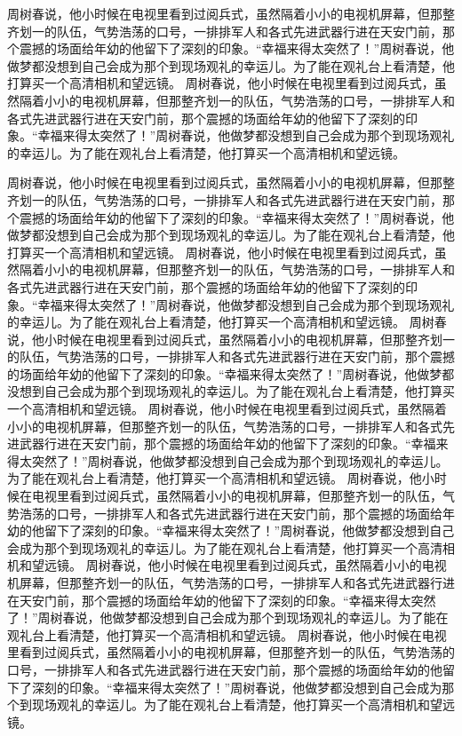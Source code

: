 周树春说，他小时候在电视里看到过阅兵式，虽然隔着小小的电视机屏幕，但那整齐划一的队伍，气势浩荡的口号，一排排军人和各式先进武器行进在天安门前，那个震撼的场面给年幼的他留下了深刻的印象。“幸福来得太突然了！”周树春说，他做梦都没想到自己会成为那个到现场观礼的幸运儿。为了能在观礼台上看清楚，他打算买一个高清相机和望远镜。
周树春说，他小时候在电视里看到过阅兵式，虽然隔着小小的电视机屏幕，但那整齐划一的队伍，气势浩荡的口号，一排排军人和各式先进武器行进在天安门前，那个震撼的场面给年幼的他留下了深刻的印象。“幸福来得太突然了！”周树春说，他做梦都没想到自己会成为那个到现场观礼的幸运儿。为了能在观礼台上看清楚，他打算买一个高清相机和望远镜。

周树春说，他小时候在电视里看到过阅兵式，虽然隔着小小的电视机屏幕，但那整齐划一的队伍，气势浩荡的口号，一排排军人和各式先进武器行进在天安门前，那个震撼的场面给年幼的他留下了深刻的印象。“幸福来得太突然了！”周树春说，他做梦都没想到自己会成为那个到现场观礼的幸运儿。为了能在观礼台上看清楚，他打算买一个高清相机和望远镜。
周树春说，他小时候在电视里看到过阅兵式，虽然隔着小小的电视机屏幕，但那整齐划一的队伍，气势浩荡的口号，一排排军人和各式先进武器行进在天安门前，那个震撼的场面给年幼的他留下了深刻的印象。“幸福来得太突然了！”周树春说，他做梦都没想到自己会成为那个到现场观礼的幸运儿。为了能在观礼台上看清楚，他打算买一个高清相机和望远镜。
周树春说，他小时候在电视里看到过阅兵式，虽然隔着小小的电视机屏幕，但那整齐划一的队伍，气势浩荡的口号，一排排军人和各式先进武器行进在天安门前，那个震撼的场面给年幼的他留下了深刻的印象。“幸福来得太突然了！”周树春说，他做梦都没想到自己会成为那个到现场观礼的幸运儿。为了能在观礼台上看清楚，他打算买一个高清相机和望远镜。
周树春说，他小时候在电视里看到过阅兵式，虽然隔着小小的电视机屏幕，但那整齐划一的队伍，气势浩荡的口号，一排排军人和各式先进武器行进在天安门前，那个震撼的场面给年幼的他留下了深刻的印象。“幸福来得太突然了！”周树春说，他做梦都没想到自己会成为那个到现场观礼的幸运儿。为了能在观礼台上看清楚，他打算买一个高清相机和望远镜。
周树春说，他小时候在电视里看到过阅兵式，虽然隔着小小的电视机屏幕，但那整齐划一的队伍，气势浩荡的口号，一排排军人和各式先进武器行进在天安门前，那个震撼的场面给年幼的他留下了深刻的印象。“幸福来得太突然了！”周树春说，他做梦都没想到自己会成为那个到现场观礼的幸运儿。为了能在观礼台上看清楚，他打算买一个高清相机和望远镜。
周树春说，他小时候在电视里看到过阅兵式，虽然隔着小小的电视机屏幕，但那整齐划一的队伍，气势浩荡的口号，一排排军人和各式先进武器行进在天安门前，那个震撼的场面给年幼的他留下了深刻的印象。“幸福来得太突然了！”周树春说，他做梦都没想到自己会成为那个到现场观礼的幸运儿。为了能在观礼台上看清楚，他打算买一个高清相机和望远镜。
周树春说，他小时候在电视里看到过阅兵式，虽然隔着小小的电视机屏幕，但那整齐划一的队伍，气势浩荡的口号，一排排军人和各式先进武器行进在天安门前，那个震撼的场面给年幼的他留下了深刻的印象。“幸福来得太突然了！”周树春说，他做梦都没想到自己会成为那个到现场观礼的幸运儿。为了能在观礼台上看清楚，他打算买一个高清相机和望远镜。

